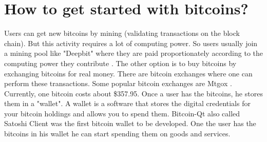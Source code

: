 \section{How to get started with bitcoins?}
Users can get new bitcoins by mining (validating transactions on the block chain). But this activity requires a lot of computing power. So users usually join a mining pool like
"Deepbit" where they are paid proportionately according to the computing power they contribute \cite{deepbit}. The other option is to buy bitcoins by exchanging bitcoins for real
money. There are bitcoin exchanges where one can perform these transactions. Some popular bitcoin exchanges are Mtgox
\cite{mtgox}. Currently, one bitcoin costs about \$357.95. Once a user has the bitcoins, he stores them in a "wallet". A wallet is a software that stores the digital credentials for
your bitcoin holdings and allows you to spend them. Bitcoin-Qt \cite{qt} also called Satoshi Client was the first bitcoin wallet to be developed. One the user has the bitcoins in his wallet he can start spending them on goods and services.